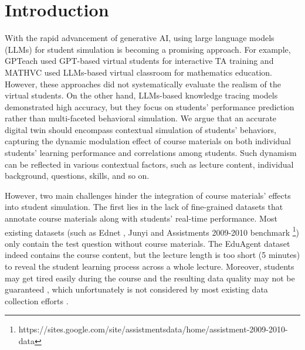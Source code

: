 \section{Introduction}
\label{sec:intro}


 With the rapid advancement of generative AI, using large language models (LLMs) for student simulation is becoming a promising approach. For example, GPTeach \cite{markel2023gpteach} used GPT-based virtual students for interactive TA training and MATHVC \cite{yue2024mathvcllmsimulatedmulticharactervirtual} used LLMs-based virtual classroom for mathematics education. However, these approaches did not systematically evaluate the realism of the virtual students. On the other hand, LLMs-based knowledge tracing models \cite{fu2024sinktstructureawareinductiveknowledge,jung2024clst,li2024integrating,lee2024monacobert,lee2024language} demonstrated high accuracy, but they focus on students' performance prediction rather than multi-faceted behavioral simulation.  
We argue that an accurate digital twin should encompass contextual simulation of students' behaviors, 
capturing the dynamic modulation effect of course materials on both individual students' learning performance and correlations among students. Such dynamism can be reflected in various contextual factors, such as lecture content, individual background, questions, skills, and so on.  


However, two main challenges hinder the integration of course materials' effects into student simulation.
%
The first lies in the lack of fine-grained datasets that annotate course materials along with students' real-time performance. Most existing datasets (such as Ednet \cite{choi2020ednet}, Junyi \cite{JunyiOnlineLearningDataset} and Assistments 2009-2010 benchmark \footnote{https://sites.google.com/site/assistmentsdata/home/assistment-2009-2010-data}) only contain the test question without course materials. The EduAgent dataset \cite{xu2024eduagent} indeed contains the course content, but the lecture length is too short (5 minutes) to reveal the student learning process across a whole lecture. Moreover, students may get tired easily during the course and the resulting data quality may not be guaranteed \cite{wang2019effects}, which unfortunately is not considered by most existing data collection efforts \cite{choi2020ednet,JunyiOnlineLearningDataset}.


